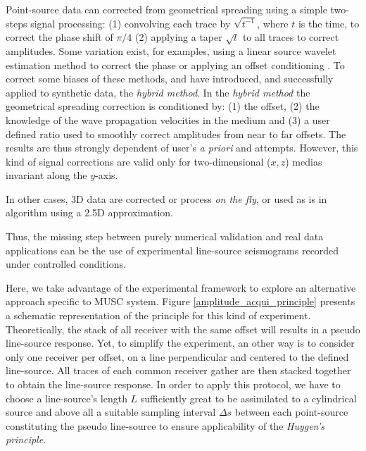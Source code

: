 \documentclass[manuscript,revised]{geophysics}
\begin{document}
\noindent Point-source data can corrected from geometrical spreading using a simple two-steps signal processing: (1) convolving each trace by $\sqrt{t^{-1}}$, where $t$ is the time, to correct the phase shift of $\pi/4$ (2) applying a taper $\sqrt{t}$ to all traces to correct amplitudes. Some variation exist, for examples, using a linear source wavelet estimation method to correct the phase \citep{Bretaudeau_FWI_2013} or applying an offset conditioning \citep{Tran_SWT_2013}. To correct some biases of these methods, \citet{Forbriger_LSS_2014} and \citet{Schafer_LSS_2014} have introduced, and successfully applied to synthetic data, the \textit{hybrid method}. In the \textit{hybrid method} the geometrical spreading correction is conditioned by: (1) the offset, (2) the knowledge of the wave propagation velocities in the medium and (3) a user defined ratio used to smoothly correct amplitudes from near to far offsets. The results are thus strongly dependent of user's \textit{a priori} and attempts. However, this kind of signal corrections are valid only for two-dimensional ($x,z$) medias invariant along the $y$-axis.    

\noindent In other cases, 3D data are corrected or process \textit{on the fly}, or used as is in algorithm using a 2.5D approximation.

\noindent Thus, the missing step between purely numerical validation and real data applications can be the use of experimental line-source seismograms recorded under controlled conditions.

\noindent Here, we take advantage of the experimental framework to explore an alternative approach specific to MUSC system. Figure \ref{amplitude_acqui_principle} presents a schematic representation of the principle for this kind of experiment. Theoretically, the stack of all receiver with the same offset will results in a pseudo line-source response. Yet, to simplify the experiment, an other way is to consider only one receiver per offset, on a line perpendicular  and centered to the defined line-source. All traces of each common receiver gather are then stacked together to obtain the line-source response. In order to apply this protocol, we have to choose a line-source's length $L$ sufficiently great to be assimilated to a cylindrical source and above all a suitable sampling interval $\Delta s$ between each point-source constituting the pseudo line-source to ensure applicability of the \textit{Huygen's principle}. 
\end{document}
